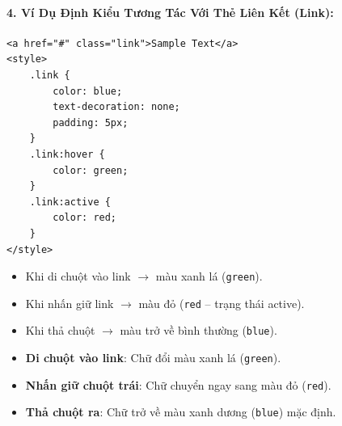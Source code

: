 \documentclass[11pt,oneside]{book}
\newcommand{\codeinline}[1]{\textcolor{accentOrange}{\texttt{#1}}}
\begin{document}
\paragraph{4. Ví Dụ Định Kiểu Tương Tác Với Thẻ Liên Kết (Link):}

\begin{codeWindow}
\begin{lstlisting}[language=HTML5]
<a href="#" class="link">Sample Text</a>
<style>
    .link {
        color: blue;
        text-decoration: none;
        padding: 5px;
    }
    .link:hover {
        color: green;
    }
    .link:active {
        color: red;
    }
</style>
\end{lstlisting}
\end{codeWindow}

\begin{conceptBox}
\begin{itemize}[leftmargin=1.5em, itemsep=2pt, parsep=0pt]
    \item Khi di chuột vào link $\rightarrow$ màu xanh lá (\codeinline{green}).
    \item Khi nhấn giữ link $\rightarrow$ màu đỏ (\codeinline{red} -- trạng thái active).
    \item Khi thả chuột $\rightarrow$ màu trở về bình thường (\codeinline{blue}).
\end{itemize}
\end{conceptBox}

\begin{browserWindow}
\begin{itemize}[leftmargin=1.5em, itemsep=3pt, parsep=0pt]
    \item \textbf{Di chuột vào link}: Chữ đổi màu xanh lá (\codeinline{green}).
    \item \textbf{Nhấn giữ chuột trái}: Chữ chuyển ngay sang màu đỏ (\codeinline{red}).
    \item \textbf{Thả chuột ra}: Chữ trở về màu xanh dương (\codeinline{blue}) mặc định.
\end{itemize}
\end{browserWindow}
\end{document}
